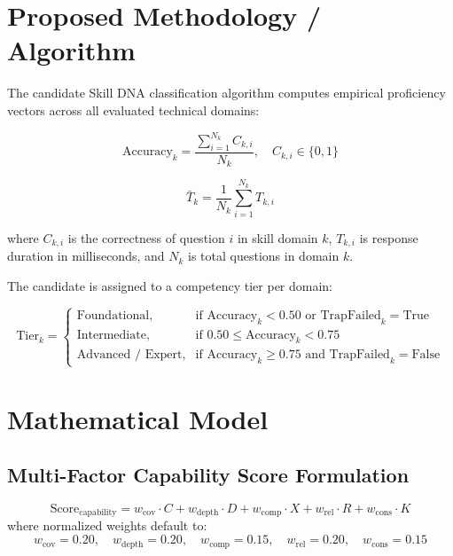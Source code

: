 \section{Proposed Methodology / Algorithm}
The candidate Skill DNA classification algorithm computes empirical proficiency vectors across all evaluated technical domains:

\begin{equation}
\text{Accuracy}_k = \frac{\sum_{i=1}^{N_k} C_{k,i}}{N_k} , \quad C_{k,i} \in \{0, 1\}
\end{equation}

\begin{equation}
\bar{T}_k = \frac{1}{N_k} \sum_{i=1}^{N_k} T_{k,i}
\end{equation}

where $C_{k,i}$ is the correctness of question $i$ in skill domain $k$, $T_{k,i}$ is response duration in milliseconds, and $N_k$ is total questions in domain $k$.

The candidate is assigned to a competency tier per domain:

\begin{equation}
\text{Tier}_k = \begin{cases} 
\text{Foundational}, & \text{if } \text{Accuracy}_k < 0.50 \text{ or } \text{TrapFailed}_k = \text{True} \\
\text{Intermediate}, & \text{if } 0.50 \le \text{Accuracy}_k < 0.75 \\
\text{Advanced / Expert}, & \text{if } \text{Accuracy}_k \ge 0.75 \text{ and } \text{TrapFailed}_k = \text{False} 
\end{cases}
\end{equation}

\section{Mathematical Model}
\subsection{Multi-Factor Capability Score Formulation}
\begin{equation}
\text{Score}_{\text{capability}} = w_{\text{cov}} \cdot C + w_{\text{depth}} \cdot D + w_{\text{comp}} \cdot X + w_{\text{rel}} \cdot R + w_{\text{cons}} \cdot K
\end{equation}
where normalized weights default to:
$$w_{\text{cov}} = 0.20, \quad w_{\text{depth}} = 0.20, \quad w_{\text{comp}} = 0.15, \quad w_{\text{rel}} = 0.20, \quad w_{\text{cons}} = 0.15$$

